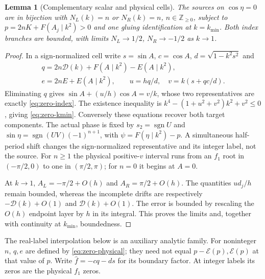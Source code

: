 \documentclass[11pt,a4paper]{article}
\newtheorem{lemma}[theorem]{Lemma}
\theoremstyle{remark}\newtheorem{remark}[theorem]{Remark}
\begin{document}
\begin{lemma}[Complementary scalar and physical cells]\label{lem:zero-scalar}
The sources on $\cos\eta=0$ are in bijection with
$N_L(k)=n$ or $N_R(k)=n$, $n\in\mathbb Z_{\ge0}$,
subject to $p=2nK+F(A_j\mid k^2)>0$ and one gluing identification
at $k=k_{\min}$. Both index branches are bounded, with limits
$N_L\to1/2$, $N_R\to-1/2$ as $k\to1$.
\end{lemma}
\begin{proof}
In a sign-normalized cell write $s=\sin A$, $c=\cos A$,
$d=\sqrt{1-k^2s^2}$ and
\begin{equation}\label{eq:zero-physical}
 \begin{gathered}
 q=2n\mathcal D(k)+F(A\mid k^2)-E(A\mid k^2),\\
 e=2nE+E(A\mid k^2),\qquad
 u=hq/d,\quad v=k(s+qc/d).
 \end{gathered}
\end{equation}
Eliminating $q$ gives $\sin A+(u/h)\cos A=v/k$, whose two
representatives are exactly \eqref{eq:zero-index}. The existence
inequality is $k^4-(1+u^2+v^2)k^2+v^2\le0$, giving
\eqref{eq:zero-kmin}. Conversely these equations recover both target
components. The actual phase is fixed by
$s_2=\operatorname{sgn}U$ and
$\sin\eta=\operatorname{sgn}(UV)(-1)^{n+1}$, with
$\psi=F(\eta\mid k^2)-p$. A simultaneous half-period shift changes the
sign-normalized representative and its integer label, not the source.
For $n\ge1$ the physical positive-$v$ interval runs from an $f_1$ root
in $(-\pi/2,0)$ to one in $(\pi/2,\pi)$; for $n=0$ it begins at $A=0$.

At $k\to1$, $A_L=-\pi/2+O(h)$ and $A_R=\pi/2+O(h)$.
The quantities $u d_j/h$ remain bounded, whereas the incomplete
drifts are respectively $-\mathcal D(k)+O(1)$ and
$\mathcal D(k)+O(1)$. The error is bounded by rescaling the $O(h)$
endpoint layer by $h$ in its integral. This proves the limits and,
together with continuity at $k_{\min}$, boundedness.
\end{proof}

The real-label interpolation below is an auxiliary analytic family.
For noninteger $n$, $q,e$ are defined by \eqref{eq:zero-physical};
they need not equal $p-\mathcal E(p),\mathcal E(p)$ at that value of $p$.
Write $\widehat f=-cq-ds$ for its boundary factor. At integer labels
its zeros are the physical $f_1$ zeros.
\end{document}
